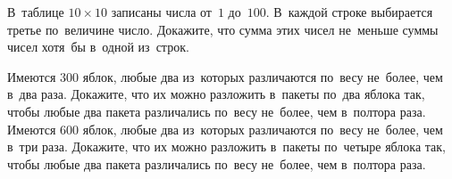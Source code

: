 \begin{problems}
\item
В~таблице $10 \times 10$ записаны числа от~$1$ до~$100$.
В~каждой строке выбирается третье по~величине число.
Докажите, что сумма этих чисел не~меньше суммы чисел хотя~бы в~одной из~строк.

\item
\subproblem
Имеются $300$ яблок, любые два из~которых различаются по~весу не~более, чем
в~два раза.
Докажите, что их можно разложить в~пакеты по~два яблока так, чтобы любые два
пакета различались по~весу не~более, чем в~полтора раза.
\\
\subproblem
Имеются $600$ яблок, любые два из~которых различаются по~весу не~более, чем
в~три раза.
Докажите, что их можно разложить в~пакеты по~четыре яблока так, чтобы любые два
пакета различались по~весу не~более, чем в~полтора раза.

\end{problems}

